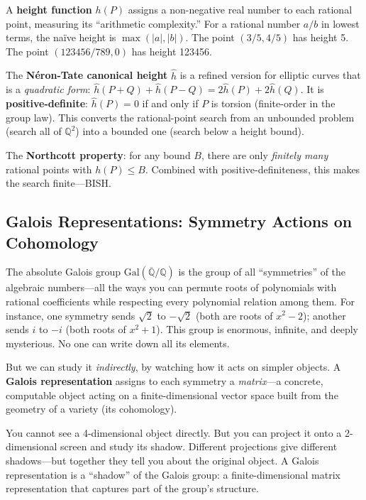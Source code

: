 \documentclass[11pt,twoside,openany]{report}
\theoremstyle{remark}
\newcommand{\BISH}{\textsf{BISH}}
\begin{document}
A \textbf{height function} $h(P)$ assigns a non-negative real number to each rational point, measuring its ``arithmetic complexity.'' For a rational number $a/b$ in lowest terms, the na\"ive height is $\max(|a|, |b|)$. The point $(3/5, 4/5)$ has height 5. The point $(123456/789, 0)$ has height 123456.

The \textbf{N\'eron-Tate canonical height} $\hat{h}$ is a refined version for elliptic curves that is a \emph{quadratic form}: $\hat{h}(P + Q) + \hat{h}(P - Q) = 2\hat{h}(P) + 2\hat{h}(Q)$. It is \textbf{positive-definite}: $\hat{h}(P) = 0$ if and only if $P$ is torsion (finite-order in the group law). This converts the rational-point search from an unbounded problem (search all of $\mathbb{Q}^2$) into a bounded one (search below a height bound).

The \textbf{Northcott property}: for any bound $B$, there are only \emph{finitely many} rational points with $h(P) \leq B$. Combined with positive-definiteness, this makes the search finite---\BISH.

\subsection*{Galois Representations: Symmetry Actions on Cohomology}

The absolute Galois group $\mathrm{Gal}(\overline{\mathbb{Q}}/\mathbb{Q})$ is the group of all ``symmetries'' of the algebraic numbers---all the ways you can permute roots of polynomials with rational coefficients while respecting every polynomial relation among them. For instance, one symmetry sends $\sqrt{2}$ to $-\sqrt{2}$ (both are roots of $x^2 - 2$); another sends $i$ to $-i$ (both roots of $x^2 + 1$). This group is enormous, infinite, and deeply mysterious. No one can write down all its elements.

But we can study it \emph{indirectly}, by watching how it acts on simpler objects. A \textbf{Galois representation} assigns to each symmetry a \emph{matrix}---a concrete, computable object acting on a finite-dimensional vector space built from the geometry of a variety (its cohomology).

\begin{analogybox}
You cannot see a 4-dimensional object directly. But you can project it onto a 2-dimensional screen and study its shadow. Different projections give different shadows---but together they tell you about the original object. A Galois representation is a ``shadow'' of the Galois group: a finite-dimensional matrix representation that captures part of the group's structure.
\end{analogybox}
\end{document}
